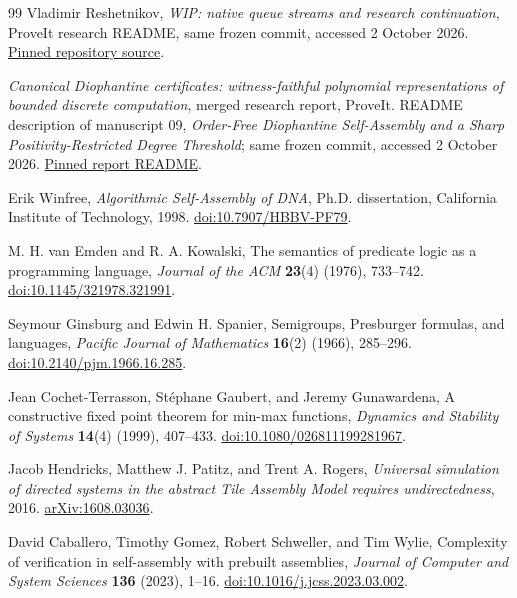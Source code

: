 \documentclass[11pt,letterpaper]{article}
\theoremstyle{definition}
\theoremstyle{remark}
\begin{document}
\begin{thebibliography}{99}
Vladimir Reshetnikov, \emph{WIP: native queue streams and research
continuation}, ProveIt research README, same frozen commit, accessed
2 October 2026.
\href{https://github.com/VladimirReshetnikov/ProveIt/blob/db3b377f0ae3ab8cb585df4eb4b859cbee5ba3c5/Computability/HilbertTenthProblem/Papers/research-wip/native-stream-queue/README.md}{Pinned repository source}.

\emph{Canonical Diophantine certificates: witness-faithful polynomial
representations of bounded discrete computation}, merged research report,
ProveIt. README description of manuscript 09, \emph{Order-Free
Diophantine Self-Assembly and a Sharp Positivity-Restricted Degree
Threshold}; same frozen commit, accessed 2 October 2026.
\href{https://github.com/VladimirReshetnikov/ProveIt/blob/db3b377f0ae3ab8cb585df4eb4b859cbee5ba3c5/SetTheory/Cardinals/docs/reports/hilbert-tenth-problem/canonical-diophantine-certificates/README.md}{Pinned report README}.

Erik Winfree, \emph{Algorithmic Self-Assembly of DNA}, Ph.D. dissertation,
California Institute of Technology, 1998.
\href{https://doi.org/10.7907/HBBV-PF79}{doi:10.7907/HBBV-PF79}.

M. H. van Emden and R. A. Kowalski, The semantics of predicate logic as a
programming language, \emph{Journal of the ACM} \textbf{23}(4) (1976),
733--742. \href{https://doi.org/10.1145/321978.321991}{doi:10.1145/321978.321991}.

Seymour Ginsburg and Edwin H. Spanier, Semigroups, Presburger formulas,
and languages, \emph{Pacific Journal of Mathematics} \textbf{16}(2)
(1966), 285--296.
\href{https://doi.org/10.2140/pjm.1966.16.285}{doi:10.2140/pjm.1966.16.285}.

Jean Cochet-Terrasson, St\'ephane Gaubert, and Jeremy Gunawardena,
A constructive fixed point theorem for min-max functions,
\emph{Dynamics and Stability of Systems} \textbf{14}(4) (1999), 407--433.
\href{https://doi.org/10.1080/026811199281967}{doi:10.1080/026811199281967}.

Jacob Hendricks, Matthew J. Patitz, and Trent A. Rogers,
\emph{Universal simulation of directed systems in the abstract Tile
Assembly Model requires undirectedness}, 2016.
\href{https://arxiv.org/abs/1608.03036}{arXiv:1608.03036}.

David Caballero, Timothy Gomez, Robert Schweller, and Tim Wylie,
Complexity of verification in self-assembly with prebuilt assemblies,
\emph{Journal of Computer and System Sciences} \textbf{136} (2023), 1--16.
\href{https://doi.org/10.1016/j.jcss.2023.03.002}{doi:10.1016/j.jcss.2023.03.002}.


\end{thebibliography}
\end{document}
